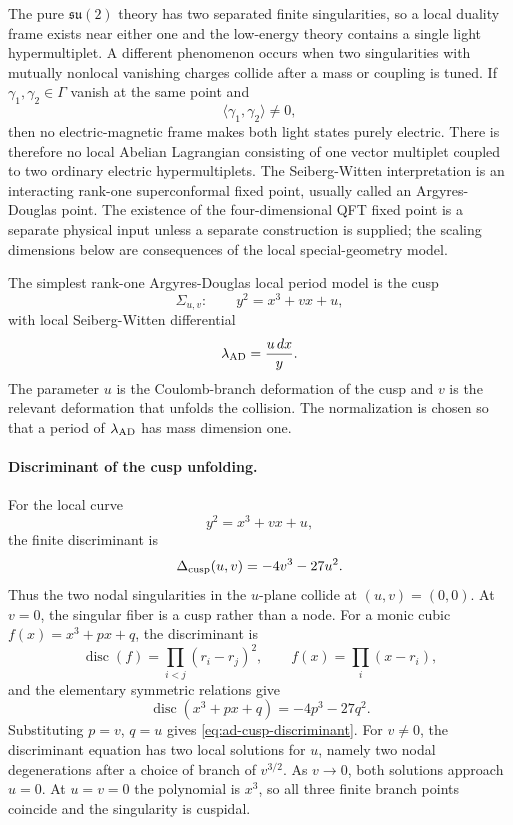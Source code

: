 The pure \(\mathfrak{su}(2)\) theory has two separated finite singularities,
so a local duality frame exists near either one and the low-energy theory
contains a single light hypermultiplet.  A different phenomenon occurs when
two singularities with mutually nonlocal vanishing charges collide after a
mass or coupling is tuned.  If \(\gamma_1,\gamma_2\in\Gamma\) vanish at the
same point and
\[
  \langle\gamma_1,\gamma_2\rangle\neq0,
\]
then no electric-magnetic frame makes both light states purely electric.
There is therefore no local Abelian Lagrangian consisting of one vector
multiplet coupled to two ordinary electric hypermultiplets.  The
Seiberg-Witten interpretation is an interacting rank-one superconformal
fixed point, usually called an Argyres-Douglas point.  The existence of the
four-dimensional QFT fixed point is a separate physical input unless a
separate construction is supplied; the scaling dimensions below are
consequences of the local special-geometry model.

\begin{definition}
\label{def:rank-one-ad-cusp-model}
The simplest rank-one Argyres-Douglas local period model is the cusp
\begin{equation}
  \Sigma_{u,v}:\qquad y^2=x^3+v x+u ,
  \label{eq:ad-a1-a2-local-curve}
\end{equation}
with local Seiberg-Witten differential
\begin{equation}
  \lambda_{\rm AD}=\frac{u\,dx}{y} .
  \label{eq:ad-local-differential}
\end{equation}
The parameter \(u\) is the Coulomb-branch deformation of the cusp and \(v\)
is the relevant deformation that unfolds the collision.  The normalization is
chosen so that a period of \(\lambda_{\rm AD}\) has mass dimension one.
\end{definition}

\paragraph{Discriminant of the cusp unfolding.}
For the local curve
\[
  y^2=x^3+v x+u ,
\]
the finite discriminant is
\begin{equation}
  \Delta_{\rm cusp}(u,v)=-4v^3-27u^2 .
  \label{eq:ad-cusp-discriminant}
\end{equation}
Thus the two nodal singularities in the \(u\)-plane collide at
\((u,v)=(0,0)\).  At \(v=0\), the singular fiber is a cusp rather than a
node.
For a monic cubic \(f(x)=x^3+px+q\), the discriminant is
\[
  \operatorname{disc}(f)
  =
  \prod_{i<j}(r_i-r_j)^2,
  \qquad
  f(x)=\prod_i(x-r_i),
\]
and the elementary symmetric relations give
\[
  \operatorname{disc}(x^3+px+q)=-4p^3-27q^2 .
\]
Substituting \(p=v\), \(q=u\) gives
\eqref{eq:ad-cusp-discriminant}.  For \(v\ne0\), the discriminant equation
has two local solutions for \(u\), namely two nodal degenerations after a
choice of branch of \(v^{3/2}\).  As \(v\to0\), both solutions approach
\(u=0\).  At \(u=v=0\) the polynomial is \(x^3\), so all three finite branch
points coincide and the singularity is cuspidal.

